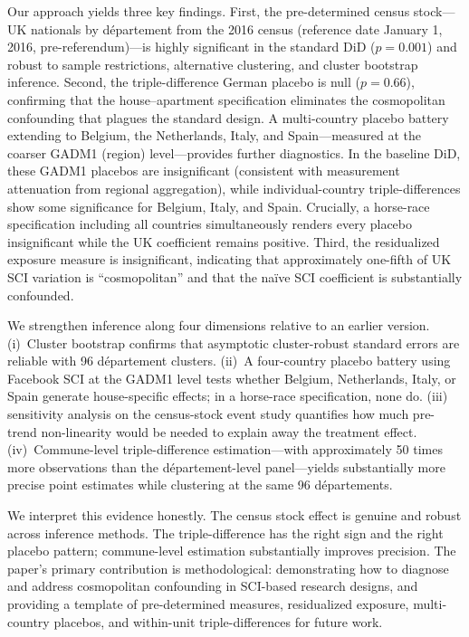 \documentclass[12pt]{article}
\begin{document}
Our approach yields three key findings. First, the pre-determined census stock---UK nationals by d\'epartement from the 2016 census (reference date January 1, 2016, pre-referendum)---is highly significant in the standard DiD ($p = 0.001$) and robust to sample restrictions, alternative clustering, and cluster bootstrap inference. Second, the triple-difference German placebo is null ($p = 0.66$), confirming that the house--apartment specification eliminates the cosmopolitan confounding that plagues the standard design. A multi-country placebo battery extending to Belgium, the Netherlands, Italy, and Spain---measured at the coarser GADM1 (region) level---provides further diagnostics. In the baseline DiD, these GADM1 placebos are insignificant (consistent with measurement attenuation from regional aggregation), while individual-country triple-differences show some significance for Belgium, Italy, and Spain. Crucially, a horse-race specification including all countries simultaneously renders every placebo insignificant while the UK coefficient remains positive. Third, the residualized exposure measure is insignificant, indicating that approximately one-fifth of UK SCI variation is ``cosmopolitan'' and that the na\"ive SCI coefficient is substantially confounded.

We strengthen inference along four dimensions relative to an earlier version. (i)~Cluster bootstrap \citep{cameron2008bootstrap} confirms that asymptotic cluster-robust standard errors are reliable with 96 d\'epartement clusters. (ii)~A four-country placebo battery using Facebook SCI at the GADM1 level tests whether Belgium, Netherlands, Italy, or Spain generate house-specific effects; in a horse-race specification, none do. (iii)~\citet{rambachan2023more} sensitivity analysis on the census-stock event study quantifies how much pre-trend non-linearity would be needed to explain away the treatment effect. (iv)~Commune-level triple-difference estimation---with approximately 50 times more observations than the d\'epartement-level panel---yields substantially more precise point estimates while clustering at the same 96 d\'epartements.

We interpret this evidence honestly. The census stock effect is genuine and robust across inference methods. The triple-difference has the right sign and the right placebo pattern; commune-level estimation substantially improves precision. The paper's primary contribution is methodological: demonstrating how to diagnose and address cosmopolitan confounding in SCI-based research designs, and providing a template of pre-determined measures, residualized exposure, multi-country placebos, and within-unit triple-differences for future work.
\end{document}
